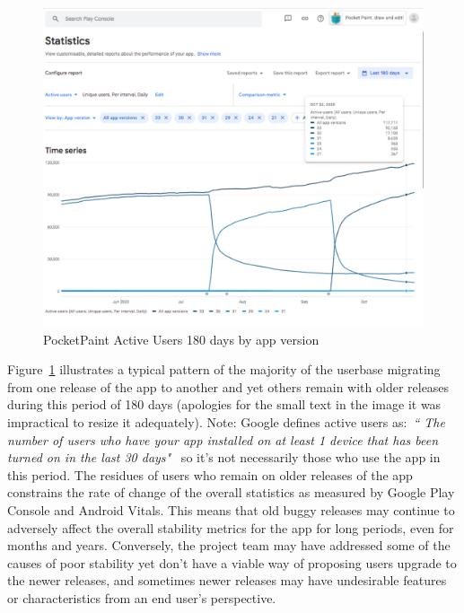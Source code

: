 \begin{figure}
    \includegraphics[width=\linewidth]{images/android-vitals-screenshots/catrobat/PocketPaint-ActiveUsers-180days-2020-10-29.pdf}
    \caption{PocketPaint Active Users 180 days by app version}
    \label{fig:pocketpaint-180d-active-users}
\end{figure}

Figure~\ref{fig:pocketpaint-180d-active-users} illustrates a typical pattern of the majority of the userbase migrating from one release of the  app to another and yet others remain with older releases during this period of 180 days (apologies for the small text in the image it was impractical to resize it adequately). Note: Google defines active users as:~\emph{``
The number of users who have your app installed on at least 1 device that has been turned on in the last 30 days"}~ so it's not necessarily those who use the app in this period. The residues of users who remain on older releases of the app constrains the rate of change of the overall statistics as measured by Google Play Console and Android Vitals. This means that old buggy releases may continue to adversely affect the overall stability metrics for the app for long periods, even for months and years. Conversely, the project team may have addressed some of the causes of poor stability yet don't have a viable way of proposing users upgrade to the newer releases, and sometimes newer releases may have undesirable features or characteristics from an end user's perspective.

